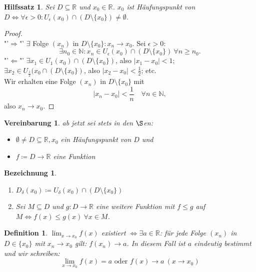 \documentclass[12pt]{extreport} %
\newcommand{\N}{\mathbb{N}}
\newcommand{\R}{\mathbb{R}}
\theoremstyle{named}
\theoremstyle{dotless}
\newtheorem{hilfssatz}[unnamedtheorem]{Hilfssatz}
\newtheorem*{bezeichnung}{Bezeichnung}
\newtheorem*{definition}{Definition}
\newtheorem*{vereinbarung}{Vereinbarung}
\begin{document}
\begin{hilfssatz} \label{6.1:hsatz}
	Sei $D \subseteq \R$ und $x_{0} \in \R$. $x_{0}$ ist Häufungspunkt von $D \iff \forall \epsilon > 0: U_{\epsilon}(x_{0}) \cap (D \setminus \{ x_{0} \}) \neq \emptyset$.
\end{hilfssatz}

\begin{proof} ~\\
	"'$\Rightarrow$"' $\exists$ Folge $(x_{n})$ in $D \setminus \{ x_{0} \} : x_{n} \rightarrow x_{0}$. Sei $\epsilon > 0$: 
	$$ \exists n_{0} \in \N: x_{n} \in U_{\epsilon}(x_{0}) \cap (D \setminus \{ x_{0} \}) ~\forall n \geq n_{0}. $$
	"'$\Leftarrow$"' $\exists x_{1} \in U_{1}(x_{0}) \cap (D \setminus \{ x_{0} \})$, also $|x_{1} - x_{0}| < 1$; \\
	$\exists x_{2} \in U_{\frac{1}{2}}(x_{0} \cap (D \setminus \{ x_{0} \})$, also $|x_{2} - x_{0}| < \frac{1}{2}$; etc. \\
	Wir erhalten eine Folge $(x_{n})$ in $D \setminus \{ x_{0} \}$ mit 
	$$ |x_{n} - x_{0}| < \frac{1}{n} \quad \forall n \in \N, $$
	also $x_{n} \rightarrow x_{0}$.
\end{proof}


\begin{vereinbarung}
	ab jetzt sei stets in den $\S$en:
	\begin{itemize}
		\item $\emptyset \neq D \subseteq \R, x_{0}$ ein Häufungspunkt von $D$ und
		\item $f \coloneqq D \rightarrow \R$ eine Funktion	
	\end{itemize}
\end{vereinbarung}


\begin{bezeichnung} ~\
	\begin{enumerate}
		\item $D_{\delta}(x_{0}) \coloneqq U_{\delta}(x_{0}) \cap (D \setminus \{ x_{0} \})$
		\item Sei $M \subseteq D$ und $g \colon D \rightarrow \R$ eine weitere Funktion mit $f \leq g$ auf $M \iff f(x) \leq g(x) ~\forall x \in M$.
	\end{enumerate}
\end{bezeichnung}


\begin{definition}
	$\lim_{x \rightarrow x_{0}} f(x)$ existiert $\iff \exists a \in \R$: für jede Folge $(x_{n})$ in $D \in \{ x_{0} \}$ mit $x_{n} \rightarrow x_{0}$ gilt: $f(x_{n}) \rightarrow a$.
	In diesem Fall ist $a$ eindeutig bestimmt und wir schreiben:
		$$ \lim_{x \rightarrow x_{0}} f(x) = a \text{ oder } f(x) \rightarrow a ~(x \rightarrow x_{0}) $$
\end{definition}
\end{document}
